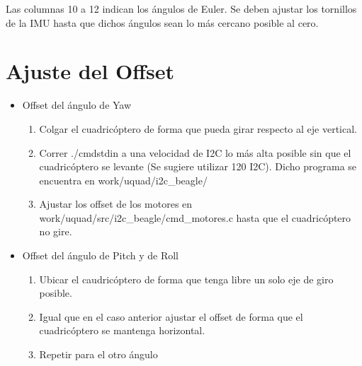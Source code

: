 \documentclass[main]{subfiles}
\begin{document}
Las columnas 10 a 12 indican los \'angulos de Euler. Se deben ajustar los tornillos de la IMU hasta que dichos \'angulos sean lo m\'as cercano posible al cero.

\section{Ajuste del Offset}
\begin{itemize}
\item Offset del \'angulo de Yaw
	\begin{enumerate}
	\item Colgar el cuadric\'optero de forma que pueda girar respecto al eje vertical. 
	\item Correr ./cmdstdin a una velocidad de I2C lo m\'as alta posible sin que el cuadric\'optero se levante (Se sugiere utilizar 120 I2C). Dicho programa se encuentra en work/uquad/i2c\_beagle/ 
	\item Ajustar los offset de los motores en work/uquad/src/i2c\_beagle/cmd\_motores.c hasta que el cuadric\'optero no gire.
	\end{enumerate}
\item Offset del \'angulo de Pitch y de Roll
	\begin{enumerate}
	\item Ubicar el caudric\'optero de forma que tenga libre un solo eje de giro posible.
	\item Igual que en el caso anterior ajustar el offset de forma que el cuadric\'optero se mantenga horizontal.
	\item Repetir para el otro \'angulo
	\end{enumerate}	
\end{itemize}
\end{document}
